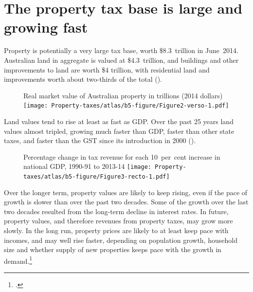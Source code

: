 \documentclass[twoside,english]{Dianab5ona4portrait}
\begin{document}
\section{The property tax base is large and growing fast\label{sec:PROP-3-2}}
Property is potentially a very large tax base, worth \$8.3~trillion in June~2014. Australian land in aggregate is valued at \$4.3~trillion, and buildings and other improvements to land are worth \$4 trillion, with residential land and improvements worth about two-thirds of the total (). 

\begin{figure}
%
{Real market value of Australian property in trillions (2014 dollars)}%
\texttt{[image: Property-taxes/atlas/b5-figure/Figure2-verso-1.pdf]}
\end{figure}

Land values tend to rise at least as fast as GDP\@. Over the past 25 years land values almost tripled, growing much faster than GDP, faster than other state taxes, and faster than the GST since its introduction in 2000 ().  

\begin{figure}
%
{Percentage change in tax revenue for each 10~per~cent increase in national GDP, 1990-91 to 2013-14}
\texttt{[image: Property-taxes/atlas/b5-figure/Figure3-recto-1.pdf]}

\end{figure}


Over the longer term, property values are likely to keep rising, even if the pace of growth is slower than over the past two decades. Some of the growth over the last two decades resulted from the long-term decline in interest rates. In future, property values, and therefore revenues from property taxes, may grow more slowly.  In the long run, property prices are likely to at least keep pace with incomes, and may well rise faster, depending on population growth, household size and whether supply of new properties keeps pace with the growth in demand.\footcite[][6--7]{RBA2014SubmissionAffordableHousingInquiry}  
\end{document}
